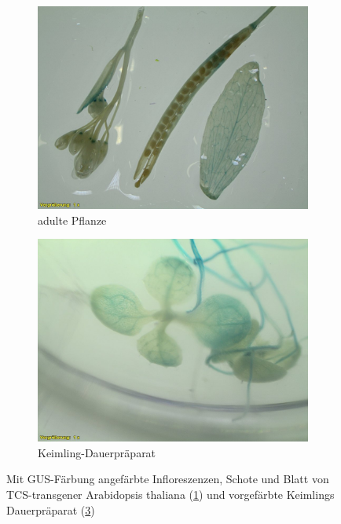 \documentclass[10pt,a4paper]{article}
\begin{document}
		\begin{figure}[H]
			\centering
			\begin{subfigure}[b]{0.45\textwidth}
				\includegraphics[width=\textwidth]{TCS_O+A.jpg}
				\caption{adulte Pflanze}
				\label{fig:cytokinin_TCS_Färbung}
			\end{subfigure}
			\hfill
			\begin{subfigure}[b]{0.45\textwidth}
				\includegraphics[width=\textwidth]{TCS_DP_O+A.jpg}
				\caption{Keimling-Dauerpräparat}
				\label{fig:cytokinin_Dauerpräparat}
			\end{subfigure}
			\caption{Mit GUS-Färbung angefärbte Infloreszenzen, Schote und Blatt von TCS-transgener Arabidopsis thaliana (\ref{fig:cytokinin_TCS_Färbung}) und vorgefärbte Keimlings Dauerpräparat (\ref{fig:cytokinin_Dauerpräparat})}
		\end{figure}
		
\end{document}
